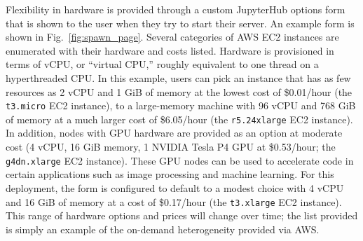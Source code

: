 \documentclass[twocolumn, linenumbers]{aastex631}
\begin{document}
Flexibility in hardware is provided through a custom JupyterHub options form that is shown to the user when they try to start their server. An example form is shown in Fig.~\ref{fig:spawn_page}. Several categories of AWS EC2 instances are enumerated with their hardware and costs listed. Hardware is provisioned in terms of vCPU, or ``virtual CPU,'' roughly equivalent to one thread on a hyperthreaded CPU. In this example, users can pick an instance that has as few resources as 2 vCPU and 1 GiB of memory at the lowest cost of \$0.01/hour (the \texttt{t3.micro} EC2 instance), to a large-memory machine with 96 vCPU and 768 GiB of memory at a much larger cost of \$6.05/hour (the \texttt{r5.24xlarge} EC2 instance). In addition, nodes with GPU hardware are provided as an option at moderate cost (4 vCPU, 16 GiB memory,  1 NVIDIA Tesla P4 GPU at \$0.53/hour; the \texttt{g4dn.xlarge} EC2 instance). These GPU nodes can be used to accelerate code in certain applications such as image processing and machine learning. For this deployment, the form is configured to default to a modest choice with 4 vCPU and 16 GiB of memory at a cost of \$0.17/hour (the \texttt{t3.xlarge} EC2 instance). This range of hardware options and prices will change over time; the list provided is simply an example of the on-demand heterogeneity provided via AWS.
\end{document}

